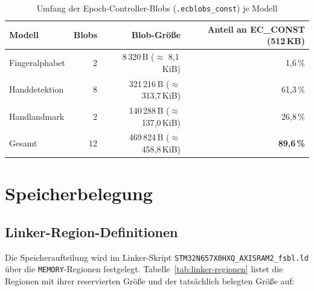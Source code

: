 \begin{table}[htbp]
  \centering
  \label{tab:ecblob-umfang}
  \begin{tabular}{lrrr}
    \toprule
    Modell & Blobs & Blob-Größe & Anteil an EC\_CONST (512\,KB) \\
    \midrule
    Fingeralphabet   &  2 & 8\,320\,B   ($\approx$ 8{,}1\,KiB)  & 1{,}6\,\% \\
    Handdetektion    &  8 & 321\,216\,B ($\approx$ 313{,}7\,KiB) & 61{,}3\,\% \\
    Handlandmark     &  2 & 140\,288\,B ($\approx$ 137{,}0\,KiB) & 26{,}8\,\% \\
    \midrule
    Gesamt           & 12 & 469\,824\,B ($\approx$ 458{,}8\,KiB) & \textbf{89{,}6\,\%} \\
    \bottomrule
  \end{tabular}
  \caption{Umfang der Epoch-Controller-Blobs (\texttt{.ecblobs\_const}) je Modell}
\end{table}

\section{Speicherbelegung}

\subsection{Linker-Region-Definitionen}\label{sec:linker-belegung}

Die Speicheraufteilung wird im Linker-Skript
\texttt{STM32N657X0HXQ\_AXISRAM2\_fsbl.ld} über die \texttt{MEMORY}-Regionen
festgelegt. Tabelle~\ref{tab:linker-regionen} listet die Regionen mit ihrer
reservierten Größe und der tatsächlich belegten Größe auf:

